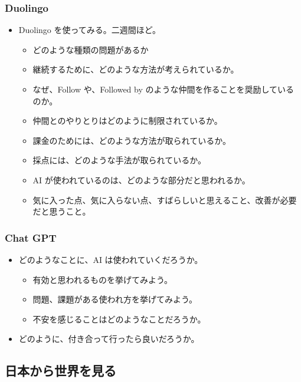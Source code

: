 \documentclass[
]{bxjsbook}
\providecommand{\tightlist}{%
  \setlength{\itemsep}{0pt}\setlength{\parskip}{0pt}}
\theoremstyle{definition}
\theoremstyle{definition}
\theoremstyle{definition}
\theoremstyle{definition}
\theoremstyle{remark}
\begin{document}
\hypertarget{duolingo}{%
\subsubsection{Duolingo}\label{duolingo}}

\begin{itemize}
\tightlist
\item
  Duolingo を使ってみる。二週間ほど。

  \begin{itemize}
  \tightlist
  \item
    どのような種類の問題があるか
  \item
    継続するために、どのような方法が考えられているか。
  \item
    なぜ、Follow や、Followed by のような仲間を作ることを奨励しているのか。
  \item
    仲間とのやりとりはどのように制限されているか。
  \item
    課金のためには、どのような方法が取られているか。
  \item
    採点には、どのような手法が取られているか。
  \item
    AI が使われているのは、どのような部分だと思われるか。
  \item
    気に入った点、気に入らない点、すばらしいと思えること、改善が必要だと思うこと。
  \end{itemize}
\end{itemize}

\hypertarget{chat-gpt}{%
\subsubsection{Chat GPT}\label{chat-gpt}}

\begin{itemize}
\tightlist
\item
  どのようなことに、AI は使われていくだろうか。

  \begin{itemize}
  \tightlist
  \item
    有効と思われるものを挙げてみよう。
  \item
    問題、課題がある使われ方を挙げてみよう。
  \item
    不安を感じることはどのようなことだろうか。
  \end{itemize}
\item
  どのように、付き合って行ったら良いだろうか。
\end{itemize}

\hypertarget{ux65e5ux672cux304bux3089ux4e16ux754cux3092ux898bux308b}{%
\subsection{日本から世界を見る}\label{ux65e5ux672cux304bux3089ux4e16ux754cux3092ux898bux308b}}
\end{document}
